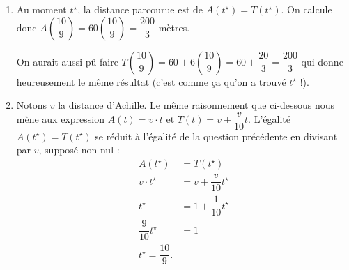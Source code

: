 {\begin{enumerate}
	\item
		Au moment $t^\star$, la distance parcourue est de $A(t^\star) = T(t^\star)$.
		On calcule donc $A\left(\dfrac{10}9\right) = 60 \left(\dfrac{10}9\right) = \dfrac{200}{3}$ mètres.
		
		On aurait aussi pû faire $T\left(\dfrac{10}9\right) = 60 + 6 \left(\dfrac{10}9\right) = 60 + \dfrac{20}3 = \dfrac{200}3$ qui donne heureusement le même résultat (c'est comme ça qu'on a trouvé $t^\star$ !).
		
	\item 
		Notons $v$ la distance d'Achille.
		Le même raisonnement que ci-dessous nous mène aux expression $A(t) = v\cdot t$ et $T(t) = v + \dfrac{v}{10} t$.
		L'égalité $A(t^\star) = T(t^\star)$ se réduit à l'égalité de la question précédente en divisant par $v$, supposé non nul :
			\begin{align*}
				A(t^\star) &= T(t^\star) \\
				v\cdot t^\star &= v + \dfrac{v}{10} t^\star \\
				t^\star &= 1 + \dfrac1{10} t^\star \\
				\dfrac9{10} t^\star &= 1 \\
				t^\star = \dfrac{10}9.
			\end{align*}
	\end{enumerate}

}


